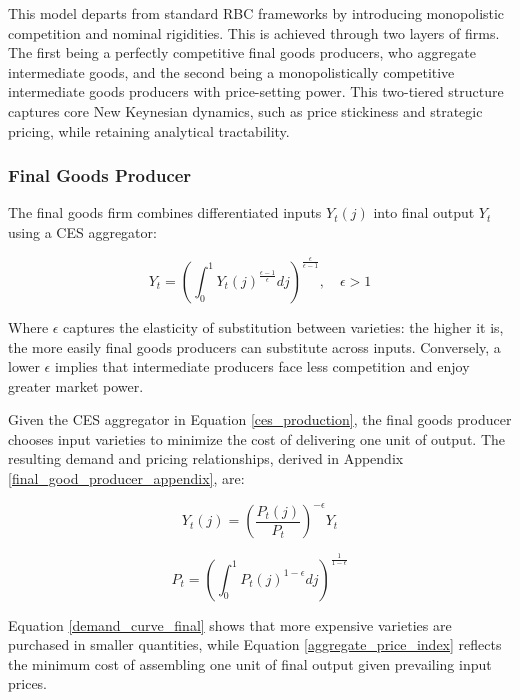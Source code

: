 \documentclass[11pt,preprint]{elsarticle}
\numberwithin{equation}{section}
\numberwithin{figure}{section}
\numberwithin{table}{section}
\begin{document}
This model departs from standard RBC frameworks by introducing
monopolistic competition and nominal rigidities. This is achieved
through two layers of firms. The first being a perfectly competitive
final goods producers, who aggregate intermediate goods, and the second
being a monopolistically competitive intermediate goods producers with
price-setting power. This two-tiered structure captures core New
Keynesian dynamics, such as price stickiness and strategic pricing,
while retaining analytical tractability.

\subsubsection{Final Goods Producer}\label{final-goods-producer}

The final goods firm combines differentiated inputs \(Y_t(j)\) into
final output \(Y_t\) using a CES aggregator:

\begin{equation}  
Y_t = \left( \int_0^1 Y_t(j)^{\frac{\epsilon-1}{\epsilon}}  dj \right)^{\frac{\epsilon}{\epsilon-1}}, \quad \epsilon > 1  
\label{ces_production}  
\end{equation}

Where \(\epsilon\) captures the elasticity of substitution between
varieties: the higher it is, the more easily final goods producers can
substitute across inputs. Conversely, a lower \(\epsilon\) implies that
intermediate producers face less competition and enjoy greater market
power.

Given the CES aggregator in Equation \eqref{ces_production}, the final
goods producer chooses input varieties to minimize the cost of
delivering one unit of output. The resulting demand and pricing
relationships, derived in Appendix \ref{final_good_producer_appendix},
are:

\begin{equation}  
Y_t(j) = \left( \frac{P_t(j)}{P_t} \right)^{-\epsilon} Y_t  
\label{demand_curve_final}  
\end{equation}

\begin{equation}  
P_t = \left( \int_0^1 P_t(j)^{1-\epsilon}  dj \right)^{\frac{1}{1-\epsilon}}  
\label{aggregate_price_index}  
\end{equation}

Equation \eqref{demand_curve_final} shows that more expensive varieties
are purchased in smaller quantities, while Equation
\eqref{aggregate_price_index} reflects the minimum cost of assembling
one unit of final output given prevailing input prices.
\end{document}
